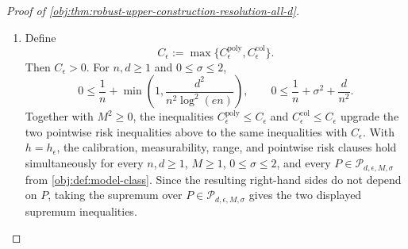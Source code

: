 \begin{proof}[Proof of \cref{obj:thm:robust-upper-construction-resolution-all-d}]
\begin{enumerate}
\item Define
\[
C_{\epsilon}:=\max\{C_{\epsilon}^{\mathrm{poly}},
C_{\epsilon}^{\mathrm{col}}\}.
\]
Then \(C_{\epsilon}>0\).  For \(n,d\ge1\) and \(0\le\sigma\le2\),
\[
0\le
\frac1n+\min\!\left(1,\frac{d^2}{n^2\log^2(en)}\right),
\qquad
0\le
\frac1n+\sigma^2+\frac{d}{n^2}.
\]
Together with \(M^2\ge0\), the inequalities
\(C_{\epsilon}^{\mathrm{poly}}\le C_{\epsilon}\) and
\(C_{\epsilon}^{\mathrm{col}}\le C_{\epsilon}\) upgrade the two pointwise risk
inequalities above to the same inequalities with \(C_{\epsilon}\).  With
\(h=h_{\epsilon}\), the calibration, measurability, range, and pointwise risk
clauses hold simultaneously for every \(n,d\ge1\), \(M\ge1\),
\(0\le\sigma\le2\), and every \(P\in\mathcal P_{d,\epsilon,M,\sigma}\) from
\cref{obj:def:model-class}.  Since the resulting right-hand sides do not depend
on \(P\), taking the supremum over \(P\in\mathcal P_{d,\epsilon,M,\sigma}\)
gives the two displayed supremum inequalities.
\end{enumerate}
\end{proof}

